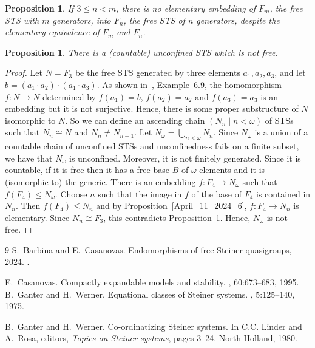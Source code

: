 \documentclass[10pt,a4paper]{article}
\theoremstyle{note}
\newtheorem{prop}[thm]{Proposition}
\begin{document}
	\begin{prop}\label{April_11_2024_7} If $3\leq n<m$, there is no elementary embedding of $F_m$, the free STS with $m$ generators, into $F_n$, the free STS of $n$ generators, despite the elementary equivalence of $F_m$ and $F_n$.
	\end{prop}

	\begin{prop}   There is a (countable) unconfined STS which is not free.
	\end{prop}

	\begin{proof} Let $N=F_3$ be  the free STS generated by three elements  $a_1,a_2,a_3$, and let \\ $b = (a_1 \cdot a_2) \cdot (a_1 \cdot a_3)$. As shown in~\cite{barcas2},  Example~6.9, the homomorphism $f:N\rightarrow N$ determined by $f(a_1)=b$, $f(a_2)=a_2$ and $f(a_3)=a_3$ is an embedding but it is not surjective. Hence, there is some proper substructure of $N$ isomorphic to $N$. So we can define an ascending chain $(N_n\mid n<\omega)$ of STSs such that $N_n\cong N$ and $N_n\neq N_{n+1}$. Let $N_\omega=\bigcup_{n<\omega}N_n$. %
 Since $N_\omega$ is a union of a countable chain of unconfined STSs and unconfinedness fails on a finite subset, we have that $N_\omega$ is unconfined. Moreover, it is not finitely generated. Since it is countable, if it is free then it has a free base $B$ of $\omega$ elements and  it is (isomorphic to)  the generic. There is an embedding $f:F_4\rightarrow N_\omega$ such that  $f(F_4)\leq N_\omega$.  Choose $n$ such that the image in $f$ of  the base of $F_4$  is contained in $N_n$.  Then $f(F_4)\leq N_n$  and by Proposition~\ref{April_11_2024_6},  $f:F_4\rightarrow N_n$ is elementary. Since  $N_n\cong F_3$, this contradicts Proposition~\ref{April_11_2024_7}.
		Hence, $N_\omega$ is not free.
	\end{proof}

\begin{thebibliography}{9}
S.~Barbina and E.~Casanovas.
\newblock Endomorphisms of free {S}teiner quasigroups, 2024.
.

E.~Casanovas.
\newblock Compactly expandable models and stability.
, 60:673--683, 1995.
B.~Ganter and H.~Werner.
\newblock Equational classes of {S}teiner systems.
, 5:125--140, 1975.

B.~Ganter and H.~Werner.
\newblock Co-ordinatizing {S}teiner systems.
\newblock In C.C. Linder and A.~Rosa, editors, {\em Topics on {S}teiner
  systems}, pages 3--24. North Holland, 1980.
\end{thebibliography}
\end{document}

